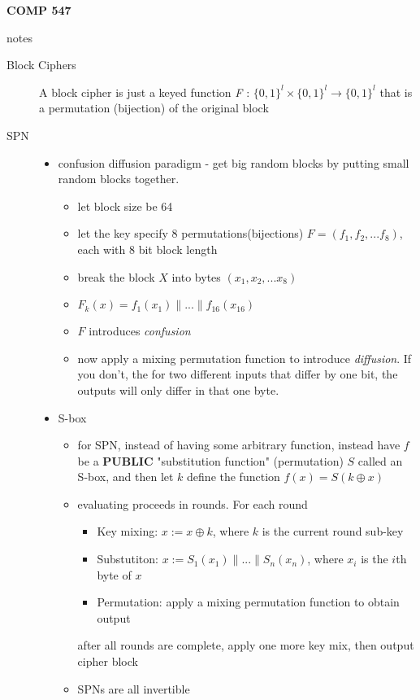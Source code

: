 \documentclass[11pt]{article}
\newcommand{\ee}[1]{\ensuremath{#1}}
\begin{document}

\thispagestyle{empty}

\noindent \textbf{COMP 547}
\begin{center}
{\LARGE notes}
\end{center}

\begin{description}

 \item[Block Ciphers] A block cipher is just a keyed function \textit{F} : \ee{\{0,1\}^\textit{l} \times \{0,1\}^\textit{l} \rightarrow \{0,1\}^\textit{l}}  that is a permutation (bijection) of the original block
 
 \item[SPN] \hfill
 \begin{itemize}
 	\item confusion diffusion paradigm - get big random blocks by putting small random blocks together.
 	\begin{itemize}
 		\item let block size be 64
 		\item let the key specify 8 permutations(bijections) \ee{F = (f_1, f_2,...f_8)}, each with 8 bit block length
 		\item break the block \ee{X} into bytes \ee{(x_1, x_2,...x_8)}
 		\item \ee{F_k(x) = f_1(x_1)\|...\|f_{16}(x_{16})}
 		\item \ee{F} introduces \textit{confusion}
 		\item now apply a mixing permutation function to introduce \textit{diffusion}. If you don't, the for two different inputs that differ by one bit, the outputs will only differ in that one byte. 
 	\end{itemize}
 	\item S-box
 	\begin{itemize}
 		\item for SPN, instead of having some arbitrary function, instead have \ee{f} be a \textbf{PUBLIC} "substitution function" (permutation) \ee{S} called an S-box, and then let \ee{k} define the function \ee{f(x) = S(k \oplus x)}
 		\item evaluating proceeds in rounds. For each round
 		\begin{itemize}
 			\item Key mixing: \ee{x:=x \oplus k}, where \ee{k} is the current round sub-key
 			\item Substutiton: \ee{x:=S_1(x_1)\|...\|S_n(x_n)}, where \ee{x_i} is the \ee{i}th byte of \ee{x}
 			\item Permutation: apply a mixing permutation function to obtain output
 		\end{itemize}
 		after all rounds are complete, apply one more key mix, then output cipher block
 		\item SPNs are all invertible
 	\end{itemize}
 \end{itemize}


\end{description}
\end{document}
